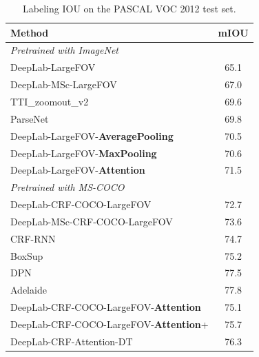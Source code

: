 \begin{table}
  \centering
  \addtolength{\tabcolsep}{2.5pt}
  \begin{tabular} {l | c}
    \toprule[0.2 em]
    {\bf Method} & mIOU \\
    \midrule \midrule
    {\it Pretrained with ImageNet} & \\
    DeepLab-LargeFOV \cite{chen2014semantic} & 65.1 \\
    DeepLab-MSc-LargeFOV \cite{chen2014semantic} & 67.0 \\
    TTI\_zoomout\_v2 \cite{mostajabi2014feedforward} & 69.6 \\
    ParseNet \cite{liu2015parsenet} & 69.8 \\
    \midrule
    DeepLab-LargeFOV-{\bf AveragePooling} & 70.5 \\
    DeepLab-LargeFOV-{\bf MaxPooling} & 70.6 \\
    DeepLab-LargeFOV-{\bf Attention} & 71.5 \\
    \midrule \midrule
    {\it Pretrained with MS-COCO} & \\
    DeepLab-CRF-COCO-LargeFOV \cite{papandreou2015weakly} & 72.7 \\
    DeepLab-MSc-CRF-COCO-LargeFOV \cite{papandreou2015weakly} & 73.6 \\
    CRF-RNN \cite{zheng2015conditional} & 74.7 \\
    BoxSup \cite{dai2015boxsup} & 75.2 \\
    DPN \cite{liu2015semantic} & 77.5 \\
    Adelaide \cite{lin2015efficient} & 77.8 \\
    \midrule
    DeepLab-CRF-COCO-LargeFOV-{\bf Attention} & 75.1 \\
    DeepLab-CRF-COCO-LargeFOV-{\bf Attention}+ & 75.7 \\
    DeepLab-CRF-Attention-DT \cite{chen2015semantic} & 76.3 \\
    \bottomrule[0.1 em]
  \end{tabular}
  \caption{Labeling IOU on the PASCAL VOC 2012 test set.}
  \label{tab:voc2012}
\end{table}

